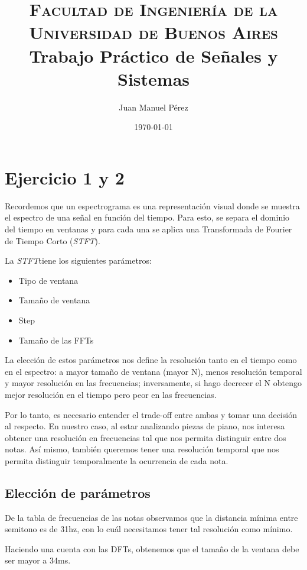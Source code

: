 \documentclass[paper=a4, fontsize=11pt]{scrartcl} %
\title{
\normalfont \normalsize
\textsc{Facultad de Ingeniería de la Universidad de Buenos Aires} \\ [20pt] %
\huge Trabajo Práctico de Señales y Sistemas \\ %
}
\author{Juan Manuel Pérez} %
\date{\normalsize\today} %
\numberwithin{equation}{section} %
\numberwithin{figure}{section} %
\numberwithin{table}{section} %
\newcommand{\stft}{\emph{STFT}}
\begin{document}
\maketitle %


\section{Ejercicio 1 y 2}

Recordemos que un espectrograma es una representación visual donde se muestra el espectro de una señal en función del tiempo. Para esto, se separa el dominio del tiempo en ventanas y para cada una se aplica una Transformada de Fourier de Tiempo Corto (\stft).

La \stft tiene los siguientes parámetros:

\begin{itemize}
    \item Tipo de ventana
    \item Tamaño de ventana
    \item Step
    \item Tamaño de las FFTs
\end{itemize}

La elección de estos parámetros nos define la resolución tanto en el tiempo como en el espectro: a mayor tamaño de ventana (mayor N), menos resolución temporal y mayor resolución en las frecuencias; inversamente, si hago decrecer el N obtengo mejor resolución en el tiempo pero peor en las frecuencias.

Por lo tanto, es necesario entender el trade-off entre ambas y tomar una decisión al respecto. En nuestro caso, al estar analizando piezas de piano, nos interesa obtener una resolución en frecuencias tal que nos permita distinguir entre dos notas. Así mismo, también queremos tener una resolución temporal que nos permita distinguir temporalmente la ocurrencia de cada nota.

\subsection{Elección de parámetros}


De la tabla de frecuencias de las notas observamos que la distancia mínima entre semitono es de 31hz, con lo cuál necesitamos tener tal resolución como mínimo.

Haciendo una cuenta con las DFTs, obtenemos que el tamaño de la ventana debe ser mayor a 34ms.
\end{document}
